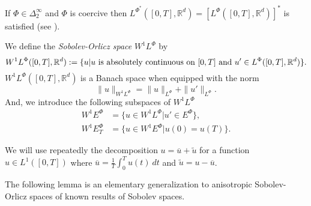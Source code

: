 \documentclass[twoside]{article}
\theoremstyle{remark}
\newcommand{\orlnor}{\|_{L^{\Phi}}}
\newcommand{\lphi}{L^{\Phi}}
\newcommand{\lpsi}{L^{\Phi^*}}
\newcommand{\ephi}{E^{\Phi}}
\newcommand{\wphi}{W^{1}\lphi}
\newcommand{\wphie}{W^{1}\ephi}
\newcommand{\rr}{\mathbb{R}}
\renewcommand{\leq}{\leqslant}
\newcounter{example}
\begin{document}
 If $\Phi \in \Delta_2^{\infty}$ and $\Phi$ is coercive then $\lpsi([0,T],\rr^d)= \left[\lphi([0,T],\rr^d)\right]^*$ is satisfied (see \cite[Thm. 2.9 , Thm. 2.10]{Desch2001}).





We define the \emph{Sobolev-Orlicz space} $\wphi$ by
\[\wphi([0,T],\rr^d):=\{u| u \hbox{ is absolutely continuous on $[0,T]$ and } u'\in \lphi([0,T],\rr^d)\}.\]
$\wphi([0,T],\rr^d)$ is a Banach space when equipped with the norm
\begin{equation}\label{def-norma-orlicz-sob}
\|  u  \|_{\wphi}= \|  u  \|_{\lphi} + \|u'\orlnor.
\end{equation}
And, we introduce the following subspaces of $\wphi$
\begin{equation}\label{def-esp-orlicz-sob-per}
\begin{split}
\wphie&=\{u\in\wphi|u'\in\ephi\},\\
\wphie_T&=\{u\in\wphie|u(0)=u(T)\}.
\end{split}
\end{equation}

%
%
 We will use repeatedly the decomposition $u=\overline{u}+\widetilde{u}$ for a function $u\in L^1([0,T])$  where $\overline{u} =\frac1T\int_0^T u(t)\ dt$ and $\widetilde{u}=u-\overline{u}$.

 The following lemma is an elementary generalization to anisotropic Sobolev-Orlicz spaces of known results of Sobolev spaces.


%
%
%
%
%
%
%
%
%
%
\end{document}
